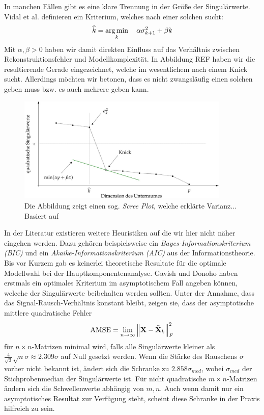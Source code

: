 In manchen Fällen gibt es eine klare Trennung in der Größe der Singulärwerte. Vidal et al. \cite{vidal} definieren ein Kriterium, welches nach einer solchen sucht:
\begin{align}
\widehat{k} = \operatorname*{arg\,min}_{k} \quad \alpha\sigma_{k+1}^2 + \beta k
\end{align}
Mit $\alpha, \beta > 0$ haben wir damit direkten Einfluss auf das Verhältnis zwischen Rekonstruktionsfehler und Modellkomplexität. In Abbildung REF haben wir die resultierende Gerade eingezeichnet, welche im wesentlichem nach einem Knick sucht. Allerdings möchten wir betonen, dass es nicht zwangsläufig einen solchen geben muss bzw. es auch mehrere geben kann.

\begin{figure}
\includegraphics[width=0.9\textwidth]{figures/scree_plot_explanation.jpg}
\caption{Die Abbildung zeigt einen sog. \textit{Scree Plot}, welche erklärte Varianz... Basiert auf \cite{vidal}}
\label{scree_plot}
\end{figure}

In der Literatur existieren weitere Heuristiken auf die wir hier nicht näher eingehen werden. Dazu gehören beispielsweise ein \textit{Bayes-Informationskriterium (BIC)} und ein \textit{Akaike-Informationskriterium (AIC)} aus der Informationstheorie. Bis vor Kurzem gab es keinerlei theoretische Resultate für die optimale Modellwahl bei der Hauptkomponentenanalyse. Gavish und Donoho \cite{gavish} haben erstmals ein optimales Kriterium im asymptotischem Fall angeben können, welcehe der Singulärwerte beibehalten werden sollten. Unter der Annahme, dass das Signal-Rausch-Verhältnis konstant bleibt, zeigen sie, dass der asymptotische mittlere quadratische Fehler 
$$\operatorname{AMSE} = \lim_{n \rightarrow \infty} \left\lVert \mathbf{X} - \widehat{\mathbf{X}}_k \right\rVert_{F}^{2}$$
für $n \times n$-Matrizen minimal wird, falls alle Singulärwerte kleiner als $\frac{4}{\sqrt{3}}\sqrt{n}\sigma \approx 2.309\sigma$ auf Null gesetzt werden. Wenn die Stärke des Rauschens $\sigma$ vorher nicht bekannt ist, ändert sich die Schranke zu $2.858\sigma_{med}$, wobei $\sigma_{med}$ der Stichprobenmedian der Singulärwerte ist. Für nicht quadratische $m \times n$-Matrizen ändern sich die Schwellenwerte abhängig von $m,n$. Auch wenn damit nur ein asymptotisches Resultat zur Verfügung steht, scheint diese Schranke in der Praxis hilfreich zu sein.

